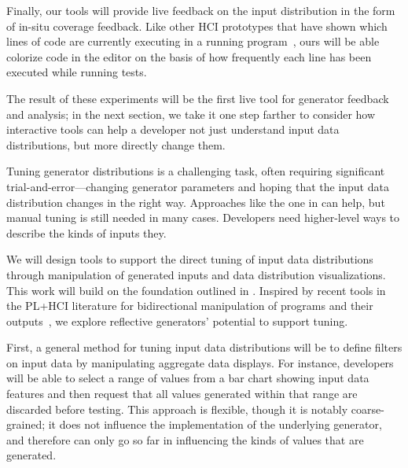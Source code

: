Finally, our tools will provide live feedback on the input
distribution in the form of in-situ coverage feedback. Like other HCI
prototypes that have shown which lines of code are currently
executing in a running program~\cite{ref:brandt2010rehearse,
  ref:oney2009firecrystal, ref:burg2013record}, ours will be
able colorize code in the editor on the basis of
how frequently each line has been executed while running tests.

The result of these experiments will be the first live tool for generator
feedback and analysis; in the next section, we take it one step
farther to consider how interactive tools can help a developer not
just understand input data distributions, but more directly change
them.

%
Tuning generator distributions is a challenging task, often requiring
significant trial-and-error---changing generator parameters and hoping
that the input data distribution changes in the right way. Approaches
like the one in  can help, but manual tuning
is still needed in many cases.
Developers need higher-level ways to describe the kinds of inputs they.

We will design tools to support the direct tuning of input data distributions
through manipulation of generated inputs and data distribution
visualizations. This work will build on the foundation outlined in
. Inspired by recent tools in
the PL+HCI literature
for bidirectional manipulation of programs and their
outputs~\cite{ref:hempel2019sketch, ref:kery2020mage,
  ref:omar2012active, ref:omar2021filling},
we explore reflective generators' potential to support tuning.

First, a general method for tuning input data distributions will be to
define filters on input data by manipulating aggregate data displays.
For instance, developers will be able to select a range of values from a bar
chart showing input data features and then request that all values generated
within that range are discarded before testing. This approach is flexible,
though it is notably coarse-grained;
it does not influence the implementation of the underlying generator, and
therefore can only go so far in influencing the kinds of values that are
generated.

